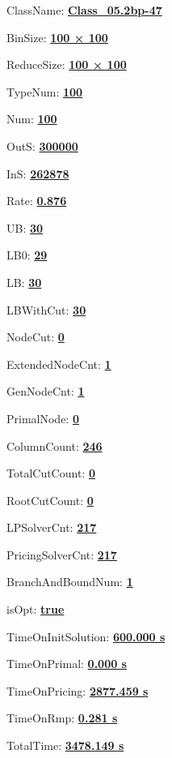 \documentclass[11pt]{article}
\begin{document}
\pagestyle{empty}


ClassName: \underline{\textbf{Class_05.2bp-47}}
\par
BinSize: \underline{\textbf{100 × 100}}
\par
ReduceSize: \underline{\textbf{100 × 100}}
\par
TypeNum: \underline{\textbf{100}}
\par
Num: \underline{\textbf{100}}
\par
OutS: \underline{\textbf{300000}}
\par
InS: \underline{\textbf{262878}}
\par
Rate: \underline{\textbf{0.876}}
\par
UB: \underline{\textbf{30}}
\par
LB0: \underline{\textbf{29}}
\par
LB: \underline{\textbf{30}}
\par
LBWithCut: \underline{\textbf{30}}
\par
NodeCut: \underline{\textbf{0}}
\par
ExtendedNodeCnt: \underline{\textbf{1}}
\par
GenNodeCnt: \underline{\textbf{1}}
\par
PrimalNode: \underline{\textbf{0}}
\par
ColumnCount: \underline{\textbf{246}}
\par
TotalCutCount: \underline{\textbf{0}}
\par
RootCutCount: \underline{\textbf{0}}
\par
LPSolverCnt: \underline{\textbf{217}}
\par
PricingSolverCnt: \underline{\textbf{217}}
\par
BranchAndBoundNum: \underline{\textbf{1}}
\par
isOpt: \underline{\textbf{true}}
\par
TimeOnInitSolution: \underline{\textbf{600.000 s}}
\par
TimeOnPrimal: \underline{\textbf{0.000 s}}
\par
TimeOnPricing: \underline{\textbf{2877.459 s}}
\par
TimeOnRmp: \underline{\textbf{0.281 s}}
\par
TotalTime: \underline{\textbf{3478.149 s}}
\par
\newpage


\end{document}
